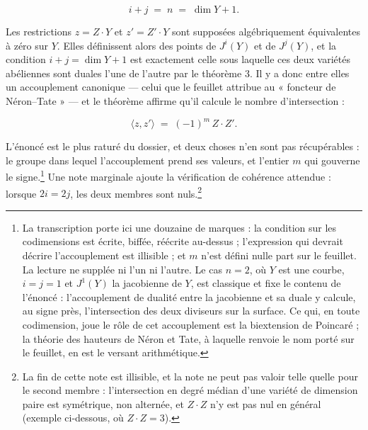 \documentclass[11pt,a4paper]{article}
\begin{document}
\[
  i + j \;=\; n \;=\; \dim Y + 1 .
\]

Les restrictions $z = Z\cdot Y$ et $z' = Z'\cdot Y$ sont supposées
algébriquement équivalentes à zéro sur $Y$. Elles définissent alors des points
de $J^{i}(Y)$ et de $J^{j}(Y)$, et la condition $i+j = \dim Y + 1$ est
exactement celle sous laquelle ces deux variétés abéliennes sont duales l'une
de l'autre par le théorème 3. Il y a donc entre elles un accouplement canonique
— celui que le feuillet attribue au « foncteur de Néron--Tate » — et le
théorème affirme qu'il calcule le nombre d'intersection :

\[
  \langle z, z'\rangle \;=\; (-1)^{m}\, Z\cdot Z' .
\]

L'énoncé est le plus raturé du dossier, et deux choses n'en sont pas
récupérables : le groupe dans lequel l'accouplement prend ses valeurs, et
l'entier $m$ qui gouverne le signe.\footnote{La transcription porte ici une
douzaine de marques : la condition sur les codimensions est écrite, biffée,
réécrite au-dessus ; l'expression qui devrait décrire l'accouplement est
illisible ; et $m$ n'est défini nulle part sur le feuillet. La lecture ne
supplée ni l'un ni l'autre. Le cas $n=2$, où $Y$ est une courbe, $i=j=1$ et
$J^{1}(Y)$ la jacobienne de $Y$, est classique et fixe le contenu de l'énoncé :
l'accouplement de dualité entre la jacobienne et sa duale y calcule, au signe
près, l'intersection des deux diviseurs sur la surface. Ce qui, en toute
codimension, joue le rôle de cet accouplement est la biextension de Poincaré ;
la théorie des hauteurs de Néron et Tate, à laquelle renvoie le nom porté sur
le feuillet, en est le versant arithmétique.} Une note marginale ajoute la
vérification de cohérence attendue : lorsque $2i = 2j$, les deux membres sont
nuls.\footnote{La fin de cette note est illisible, et la note ne peut pas valoir
telle quelle pour le second membre : l'intersection en degré médian d'une
variété de dimension paire est symétrique, non alternée, et $Z\cdot Z$ n'y est
pas nul en général (exemple ci-dessous, où $Z\cdot Z = 3$).}
\end{document}
